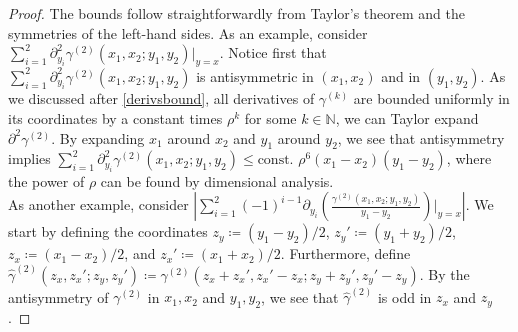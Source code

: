 \documentclass[a4paper,11pt]{article}
\newcommand{\abs}[1]{\left\lvert #1 \right\rvert}
\numberwithin{equation}{section}
\begin{document}
	\begin{proof}
		The bounds follow straightforwardly from Taylor's theorem and the symmetries of the left-hand sides. As an example, consider $ \sum_{i=1}^{2}\partial_{y_i}^2\gamma^{(2)}(x_1,x_2;y_1,y_2)\rvert_{y=x} $. Notice first that $ \sum_{i=1}^{2}\partial_{y_i}^2\gamma^{(2)}(x_1,x_2;y_1,y_2) $ is antisymmetric in $ (x_1,x_2) $ and in $ (y_1,y_2) $. As we discussed after \eqref{derivsbound}, all derivatives of $ \gamma^{(k)} $ are bounded uniformly in its coordinates by a constant times $ \rho^k $ for some $ k\in\mathbb{N} $, we can Taylor expand $ \partial^2\gamma^{(2)} $. By expanding $ x_1 $ around $ x_2 $ and $ y_1 $ around $ y_2 $, we see that antisymmetry implies $ \sum_{i=1}^{2}\partial_{y_i}^2\gamma^{(2)}(x_1,x_2;y_1,y_2)\leq \text{const. }\rho^6(x_1-x_2)(y_1-y_2) $, where the power of $ \rho $ can be found by dimensional analysis.\\
        As another example, consider $\abs{\sum_{i=1}^{2}(-1)^{i-1}\partial_{y_i}\left(\frac{\gamma^{(2)}(x_1,x_2;y_1,y_2)}{y_1-y_2}\right)\Bigg\rvert_{y=x}}$. We start by defining the coordinates $z_y\coloneqq (y_1-y_2)/2$, $z_y'\coloneqq (y_1+y_2)/2$, $z_x\coloneqq (x_1-x_2)/2$, and $z_x'\coloneqq (x_1+x_2)/2$. Furthermore, define $\hat{\gamma}^{(2)}(z_x,z_x';z_y,z_y')\coloneqq\gamma^{(2)}(z_x+z_x',z_x'-z_x;z_y+z_y',z_y'-z_y)$. By the antisymmetry of $\gamma^{(2)}$ in $x_1,x_2$ and $y_1,y_2$, we see that $\hat{\gamma}^{(2)}$ is odd in $z_x$ and $z_y$.
        

\end{proof}
\end{document}
